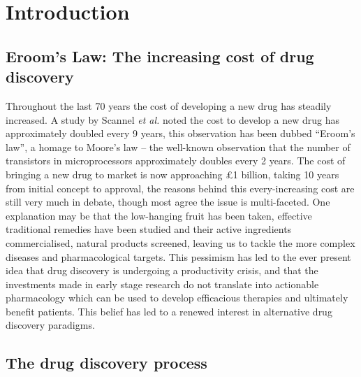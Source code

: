 \documentclass[a4paper,11pt,twoside,openright]{scrbook}
\begin{document}
\chapter{Introduction} \label{chapter:intro}


\section{Eroom's Law: The increasing cost of drug discovery}
Throughout the last 70 years the cost of developing a new drug has steadily increased.
A study by Scannel \textit{et al.} noted the cost to develop a new drug has approximately doubled every 9 years, \cite{Scannell2012} this observation has been dubbed ``Eroom's law'', a homage to Moore's law -- the well-known observation that the number of transistors in microprocessors approximately doubles every 2 years.
The cost of bringing a new drug to market is now approaching £1 billion, taking 10 years from initial concept to approval, the reasons behind this every-increasing cost are still very much in debate, though most agree the issue is multi-faceted.
One explanation may be that the low-hanging fruit has been taken, effective traditional remedies have been studied and their active ingredients commercialised, natural products screened, leaving us to tackle the more complex diseases and pharmacological targets.  
This pessimism has led to the ever present idea that drug discovery is undergoing a productivity crisis, and that the investments made in early stage research do not translate into actionable pharmacology which can be used to develop efficacious therapies and ultimately benefit patients.
This belief has led to a renewed interest in alternative drug discovery paradigms.


\section{The drug discovery process}
\end{document}
